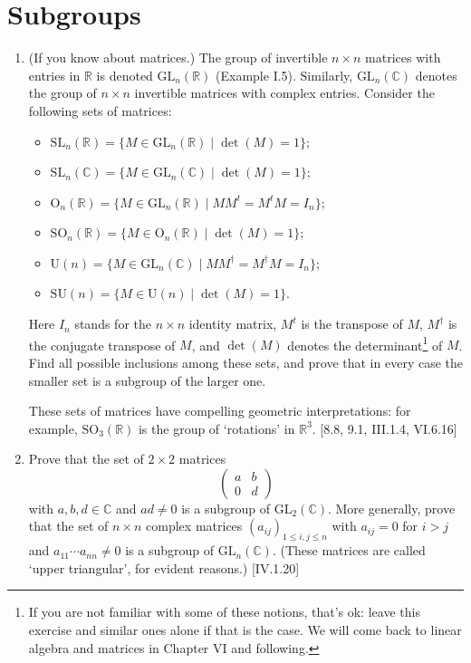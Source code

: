 \section{Subgroups}
\begin{enumerate}
    \item (If you know about matrices.) The group of invertible $n \times n$ matrices with entries in $\mathbb{R}$ is denoted $\text{GL}_n(\mathbb{R})$ (Example I.5). Similarly, $\text{GL}_n(\mathbb{C})$ denotes the group of $n \times n$ invertible matrices with complex entries. Consider the following sets of matrices:
          \begin{itemize}
              \item $\text{SL}_n(\mathbb{R}) = \{ M \in \text{GL}_n(\mathbb{R}) \mid \det(M) = 1 \}$;
              \item $\text{SL}_n(\mathbb{C}) = \{ M \in \text{GL}_n(\mathbb{C}) \mid \det(M) = 1 \}$;
              \item $\text{O}_n(\mathbb{R}) = \{ M \in \text{GL}_n(\mathbb{R}) \mid M M^t = M^t M = I_n \}$;
              \item $\text{SO}_n(\mathbb{R}) = \{ M \in \text{O}_n(\mathbb{R}) \mid \det(M) = 1 \}$;
              \item $\text{U}(n) = \{ M \in \text{GL}_n(\mathbb{C}) \mid M M^\dagger = M^\dagger M = I_n \}$;
              \item $\text{SU}(n) = \{ M \in \text{U}(n) \mid \det(M) = 1 \}$.
          \end{itemize}
          Here $I_n$ stands for the $n \times n$ identity matrix, $M^t$ is the transpose of $M$, $M^\dagger$ is the conjugate transpose of $M$, and $\det(M)$ denotes the determinant\footnote{If you are not familiar with some of these notions, that's ok: leave this exercise and similar ones alone if that is the case. We will come back to linear algebra and matrices in Chapter VI and following.} of $M$. Find all possible inclusions among these sets, and prove that in every case the smaller set is a subgroup of the larger one.

          These sets of matrices have compelling geometric interpretations: for example, $\text{SO}_3(\mathbb{R})$ is the group of `rotations' in $\mathbb{R}^3$. [8.8, 9.1, III.1.4, VI.6.16]

    \item Prove that the set of $2 \times 2$ matrices
          \[ \begin{pmatrix} a & b \\ 0 & d \end{pmatrix} \]
          with $a, b, d \in \mathbb{C}$ and $ad \ne 0$ is a subgroup of $\text{GL}_2(\mathbb{C})$. More generally, prove that the set of $n \times n$ complex matrices $(a_{ij})_{1 \le i,j \le n}$ with $a_{ij}=0$ for $i > j$ and $a_{11} \cdots a_{nn} \ne 0$ is a subgroup of $\text{GL}_n(\mathbb{C})$. (These matrices are called `upper triangular', for evident reasons.) [IV.1.20]


\end{enumerate}
